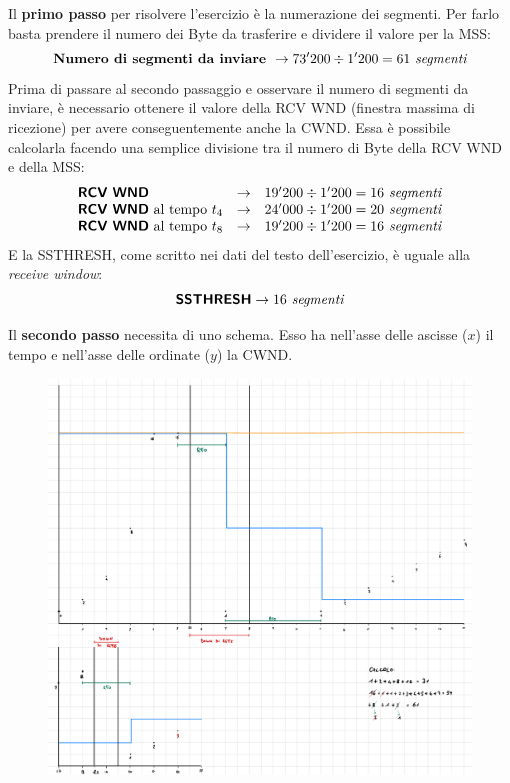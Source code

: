 \documentclass[a4paper]{article}
\begin{document}
	\noindent
	Il \textbf{primo passo} per risolvere l'esercizio è la numerazione dei segmenti. Per farlo basta prendere il numero dei Byte da trasferire e dividere il valore per la \textsf{MSS}:
	\begin{equation*}
		\textbf{Numero di segmenti da inviare } \rightarrow 73'200 \div 1'200 = 61 \emph{ segmenti}
	\end{equation*}
	Prima di passare al secondo passaggio e osservare il numero di segmenti da inviare, è necessario ottenere il valore della \textsf{RCV WND} (finestra massima di ricezione) per avere conseguentemente anche la \textsf{CWND}. Essa è possibile calcolarla facendo una semplice divisione tra il numero di Byte della \textsf{RCV WND} e della \textsf{MSS}:
	\begin{equation*}
		\begin{array}{lll}
			\textbf{\textsf{RCV WND}} & \rightarrow & 19'200 \div 1'200 = 16 \emph{ segmenti} \\
			\textbf{\textsf{RCV WND}}\text{ al tempo }t_{4} & \rightarrow & 24'000 \div 1'200 = 20 \emph{ segmenti} \\
			\textbf{\textsf{RCV WND}}\text{ al tempo }t_{8} & \rightarrow & 19'200 \div 1'200 = 16 \emph{ segmenti}
		\end{array}
	\end{equation*}
	E la \textsf{SSTHRESH}, come scritto nei dati del testo dell'esercizio, è uguale alla \emph{receive window}:
	\begin{equation*}
		\textsf{\textbf{SSTHRESH}} \rightarrow 16 \emph{ segmenti}
	\end{equation*}\newpage
	
	\noindent
	Il \textbf{secondo passo} necessita di uno schema. Esso ha nell’asse delle ascisse ($x$) il tempo e nell’asse delle ordinate ($y$) la \textsf{CWND}.
	\begin{figure}[!htp]
		\centering
		\includegraphics[width=\textwidth]{img/ex6_congestione.pdf}
	\end{figure}\newpage
\end{document}
